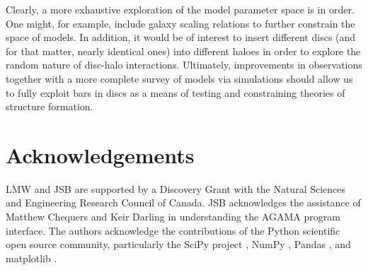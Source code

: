 Clearly, a more exhaustive exploration of the model parameter space is
in order.  One might, for example, include galaxy scaling relations to
further constrain the space of models.  In addition, it would be of
interest to insert different discs (and for that matter, nearly
identical ones) into different haloes in order to explore the
random nature of disc-halo interactions.  Ultimately, improvements
in observations together with a more complete survey of models via
simulations should allow us to fully exploit bars in discs as a means
of testing and constraining theories of structure formation.

\section*{Acknowledgements}
{LMW and JSB are supported by a Discovery Grant with the Natural
  Sciences and Engineering Research Council of Canada. JSB
  acknowledges the assistance of Matthew Chequers and Keir Darling in
  understanding the \textsc{AGAMA} program interface. The authors
  acknowledge the contributions of the Python scientific open source community,
  particularly the SciPy project \citep{scipy}, NumPy \citep{numpy}, Pandas \citep{pandas},
  and matplotlib \citep{matplotlib}.}





